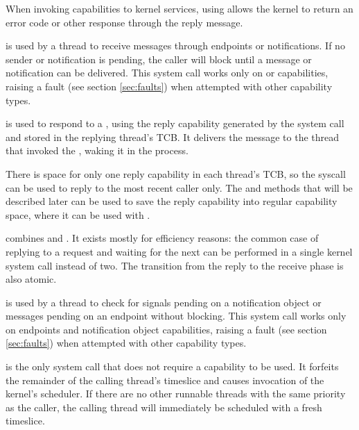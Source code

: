 \begin{description}
    When invoking capabilities to kernel services, using
     allows the kernel to return an error code
    or other response through the reply message.

    \item[\apifunc{seL4\_Recv}{sel4_recv}] is used by a thread to receive
    messages through endpoints or notifications. If no sender or
    notification is pending, the caller
    will block until a message or notification can be delivered. This system call works only on
     or  capabilities, raising a fault (see section \ref{sec:faults}) when
    attempted with other capability types.

    \item[\apifunc{seL4\_Reply}{sel4_reply}] is used to respond to a
    , using the reply capability generated by the
     system call and stored in the replying
    thread's TCB. It delivers the message to the thread that invoked
    the , waking it in
    the process.

    There is space for only one reply capability in each thread's TCB, so the
     syscall can be used to reply to the most
    recent caller only. The 
    and  methods that will be described later can be used to save the reply
    capability into regular capability space, where it can be used with
    .

    \item[\apifunc{seL4\_ReplyRecv}{sel4_replyrecv}] combines  and
    . It exists mostly for efficiency reasons: the common case of
    replying to a request and waiting for the next can be performed in
    a single kernel system call instead of two. The transition from
    the reply to the receive phase is also atomic.

    \item[\apifunc{seL4\_NBRecv}{sel4_nbrecv}] is used by a thread to check for
    signals pending on a notification object or messages pending on an endpoint without blocking.
    This system call works only on endpoints and notification object 
    capabilities, raising a fault (see section \ref{sec:faults}) when attempted
    with other capability types.

    \item[\apifunc{seL4\_Yield}{sel4_yield}] is the only system call that does not require
    a capability to be used. It forfeits the remainder of the calling thread's
    timeslice and causes invocation of the kernel's scheduler.
    If there are no other runnable threads with the same
    priority as the caller, the calling thread will immediately be
    scheduled with a fresh timeslice.
\end{description}

